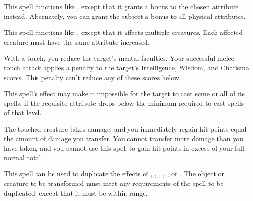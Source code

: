 \begin{spelleffect}
    This spell functions like , except that it grants a  bonus to the chosen attribute instead. Alternately, you can grant the subject a  bonus to all physical attributes.
\end{spelleffect}

\spellrng{\rngmed}
\begin{spelleffect}
  This spell functions like , except that it affects multiple creatures. Each affected creature must have the same attribute increased. 
\end{spelleffect}

\spellrng{\rngclose}
\spelldur{\durshort}
\begin{spelleffect}
  With a touch, you reduce the target's mental faculties. Your successful melee touch attack applies a  penalty to the target's Intelligence, Wisdom, and Charisma scores. This penalty can't reduce any of these scores below .
\end{spelleffect}
\begin{spellnotes}
  This spell's effect may make it impossible for the target to cast some or all of its spells, if the requisite attribute drops below the minimum required to cast spells of that level.
\end{spellnotes}

\begin{spelleffect}
  The touched creature takes damage, and you immediately regain hit points equal the amount of damage you transfer. You cannot transfer more damage than you have taken, and you cannot use this spell to gain hit points in excess of your full normal total.
\end{spelleffect}

\spellrng{\rngmed}
\begin{spelleffect}
  This spell can be used to duplicate the effects of , , , , , or . The object or creature to be transformed must meet any requirements of the spell to be duplicated, except that it must be within \rngmed range.
\end{spelleffect}

